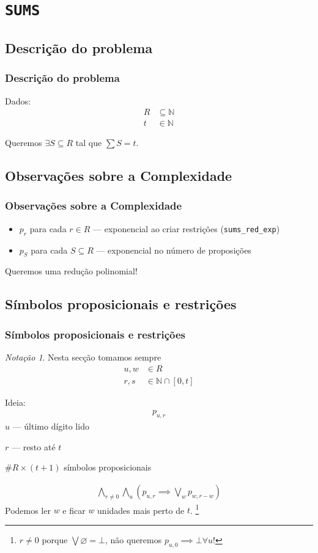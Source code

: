\documentclass[a4paper,12pt]{beamer}
\theoremstyle{definition}
\theoremstyle{theorem}
\theoremstyle{remark}
\newtheorem{notç}[defn]{Notação}
\newcommand{\sums}{\texttt{SUMS}\xspace}
\newcommand{\code}[1]{\texttt{#1}}
\begin{document}
\section{\sums}
\subsection{Descrição do problema}
\begin{frame}
\frametitle{Descrição do problema}
Dados:
\begin{align*}
   R&\subseteq\mathbb N\\
   t &\in\mathbb N
\end{align*}
\pause

Queremos $\exists S\subseteq R$ tal que $\sum S = t$.
\end{frame}

\subsection{Observações sobre a Complexidade}
\begin{frame}
\frametitle{Observações sobre a Complexidade}
\begin{itemize}
   \item $p_r$ para cada $r\in R$
      \---- exponencial ao criar restrições (\code{sums\_red\_exp})
      \pause
   \item $p_S$ para cada $S\subseteq R$
      \---- exponencial no número de proposições
\end{itemize}
      \pause

Queremos uma redução polinomial!
\end{frame}

\subsection{Símbolos proposicionais e restrições}
\begin{frame}
\frametitle{Símbolos proposicionais e restrições}
\begin{notç}
   Nesta secção tomamos sempre
   \begin{align}
      u,w&\in R\\
      r,s&\in \mathbb N\cap[0,t]
   \end{align}
\end{notç}
\end{frame}

\begin{frame}
Ideia:
   \begin{align}
   p_{u,r}
   \end{align}
$u$ \---- último dígito lido

$r$ \---- resto até $t$

$\#R\times(t+1)$ símbolos proposicionais

\pause
\begin{align}
   \bigwedge_{r\neq0}
   \bigwedge_{u}\left( p_{u,r}
   \implies
   \bigvee_{w}p_{w,r-w}
   \right)
\end{align}
Podemos ler $w$ e ficar $w$ unidades mais perto de $t$.
\footnote{
   $r\neq 0$ porque $\bigvee\varnothing=\bot$,
   não queremos $p_{u,0}\implies\bot \forall u$!
}
\end{frame}
\end{document}
